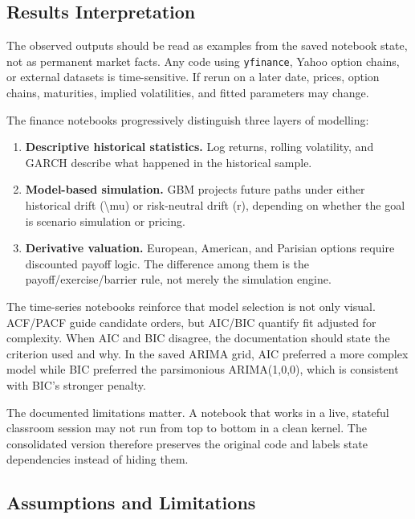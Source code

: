 \documentclass[
  11pt,
]{article}
\providecommand{\tightlist}{%
  \setlength{\itemsep}{0pt}\setlength{\parskip}{0pt}}
\begin{document}
\subsection{Results Interpretation}\label{results-interpretation}

The observed outputs should be read as examples from the saved notebook state, not as permanent market facts. Any code using \texttt{yfinance}, Yahoo option chains, or external datasets is time-sensitive. If rerun on a later date, prices, option chains, maturities, implied volatilities, and fitted parameters may change.

The finance notebooks progressively distinguish three layers of modelling:

\begin{enumerate}
\def\labelenumi{\arabic{enumi}.}
\tightlist
\item
  \textbf{Descriptive historical statistics.} Log returns, rolling volatility, and GARCH describe what happened in the historical sample.
\item
  \textbf{Model-based simulation.} GBM projects future paths under either historical drift (\textbackslash mu) or risk-neutral drift (r), depending on whether the goal is scenario simulation or pricing.
\item
  \textbf{Derivative valuation.} European, American, and Parisian options require discounted payoff logic. The difference among them is the payoff/exercise/barrier rule, not merely the simulation engine.
\end{enumerate}

The time-series notebooks reinforce that model selection is not only visual. ACF/PACF guide candidate orders, but AIC/BIC quantify fit adjusted for complexity. When AIC and BIC disagree, the documentation should state the criterion used and why. In the saved ARIMA grid, AIC preferred a more complex model while BIC preferred the parsimonious ARIMA(1,0,0), which is consistent with BIC's stronger penalty.

The documented limitations matter. A notebook that works in a live, stateful classroom session may not run from top to bottom in a clean kernel. The consolidated version therefore preserves the original code and labels state dependencies instead of hiding them.

\subsection{Assumptions and Limitations}\label{assumptions-and-limitations}
\end{document}
